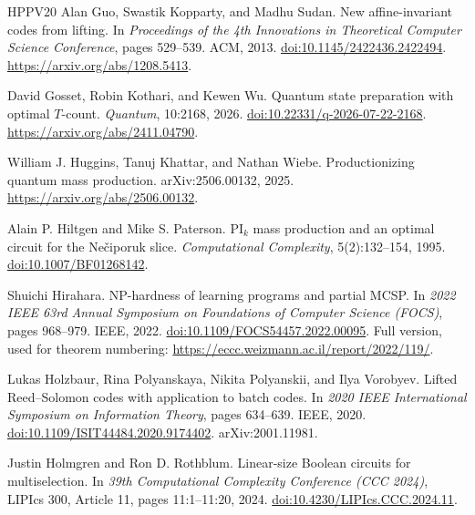 \documentclass[11pt]{article}
\begin{document}
\begin{thebibliography}{HPPV20}
Alan Guo, Swastik Kopparty, and Madhu Sudan.
\newblock New affine-invariant codes from lifting.
\newblock In \emph{Proceedings of the 4th Innovations in Theoretical Computer
Science Conference}, pages 529--539. ACM, 2013.
\newblock \href{https://doi.org/10.1145/2422436.2422494}{doi:10.1145/2422436.2422494}.
\newblock \url{https://arxiv.org/abs/1208.5413}.

David Gosset, Robin Kothari, and Kewen Wu.
\newblock Quantum state preparation with optimal $T$-count.
\newblock \emph{Quantum}, 10:2168, 2026.
\newblock \href{https://doi.org/10.22331/q-2026-07-22-2168}{doi:10.22331/q-2026-07-22-2168}.
\newblock \url{https://arxiv.org/abs/2411.04790}.

William J. Huggins, Tanuj Khattar, and Nathan Wiebe.
\newblock Productionizing quantum mass production.
\newblock arXiv:2506.00132, 2025.
\newblock \url{https://arxiv.org/abs/2506.00132}.

Alain P. Hiltgen and Mike S. Paterson.
\newblock $\mathrm{PI}_k$ mass production and an optimal circuit for the
Ne\v{c}iporuk slice.
\newblock \emph{Computational Complexity}, 5(2):132--154, 1995.
\newblock \href{https://doi.org/10.1007/BF01268142}{doi:10.1007/BF01268142}.

Shuichi Hirahara.
\newblock NP-hardness of learning programs and partial MCSP.
\newblock In \emph{2022 IEEE 63rd Annual Symposium on Foundations of
Computer Science (FOCS)}, pages 968--979. IEEE, 2022.
\newblock \href{https://doi.org/10.1109/FOCS54457.2022.00095}{doi:10.1109/FOCS54457.2022.00095}.
\newblock Full version, used for theorem numbering:
\url{https://eccc.weizmann.ac.il/report/2022/119/}.

Lukas Holzbaur, Rina Polyanskaya, Nikita Polyanskii, and Ilya Vorobyev.
\newblock Lifted Reed--Solomon codes with application to batch codes.
\newblock In \emph{2020 IEEE International Symposium on Information Theory},
pages 634--639. IEEE, 2020.
\newblock \href{https://doi.org/10.1109/ISIT44484.2020.9174402}{doi:10.1109/ISIT44484.2020.9174402}.
\newblock arXiv:2001.11981.

Justin Holmgren and Ron D. Rothblum.
\newblock Linear-size Boolean circuits for multiselection.
\newblock In \emph{39th Computational Complexity Conference (CCC 2024)},
LIPIcs 300, Article 11, pages 11:1--11:20, 2024.
\newblock \href{https://doi.org/10.4230/LIPIcs.CCC.2024.11}{doi:10.4230/LIPIcs.CCC.2024.11}.


\end{thebibliography}
\end{document}
